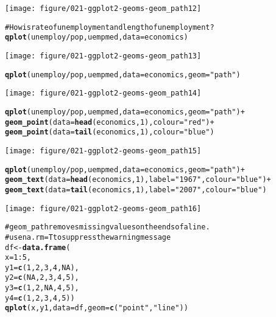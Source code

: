 \documentclass[a4paper,titlepage]{tufte-handout}\usepackage{graphicx, color}
\makeatletter
\def\maxwidth{ %
  \ifdim\Gin@nat@width>\linewidth
    \linewidth
  \else
    \Gin@nat@width
  \fi
}
\newcommand{\hlfunctioncall}[1]{\textcolor[rgb]{0.501960784313725,0,0.329411764705882}{\textbf{#1}}}%
\newcommand{\hlstring}[1]{\textcolor[rgb]{0.6,0.6,1}{#1}}%
\newcommand{\hlcomment}[1]{\textcolor[rgb]{0.180392156862745,0.6,0.341176470588235}{#1}}%
\newenvironment{kframe}{%
 \def\at@end@of@kframe{}%
 \ifinner\ifhmode%
  \def\at@end@of@kframe{\end{minipage}}%
  \begin{minipage}{\columnwidth}%
 \fi\fi%
 \def\FrameCommand##1{\hskip\@totalleftmargin \hskip-\fboxsep
 \colorbox{shadecolor}{##1}\hskip-\fboxsep
     \hskip-\linewidth \hskip-\@totalleftmargin \hskip\columnwidth}%
 \MakeFramed {\advance\hsize-\width
   \@totalleftmargin\z@ \linewidth\hsize
   \@setminipage}}%
 {\par\unskip\endMakeFramed%
 \at@end@of@kframe}
\newenvironment{knitrout}{}{} %
\makeatother
\begin{document}
\begin{knitrout}
\begin{kframe}
\end{kframe}\texttt{[image: figure/021-ggplot2-geoms-geom\_path12]} \begin{kframe}\begin{alltt}
\hlcomment{# How is rate of unemployment and length of unemployment?}
\hlfunctioncall{qplot}(unemploy/pop, uempmed, data=economics)
\end{alltt}
\end{kframe}\texttt{[image: figure/021-ggplot2-geoms-geom\_path13]} \begin{kframe}\begin{alltt}
\hlfunctioncall{qplot}(unemploy/pop, uempmed, data=economics, geom=\hlstring{"path"})
\end{alltt}
\end{kframe}\texttt{[image: figure/021-ggplot2-geoms-geom\_path14]} \begin{kframe}\begin{alltt}
\hlfunctioncall{qplot}(unemploy/pop, uempmed, data=economics, geom=\hlstring{"path"}) +
  \hlfunctioncall{geom_point}(data=\hlfunctioncall{head}(economics, 1), colour=\hlstring{"red"}) +
  \hlfunctioncall{geom_point}(data=\hlfunctioncall{tail}(economics, 1), colour=\hlstring{"blue"})
\end{alltt}
\end{kframe}\texttt{[image: figure/021-ggplot2-geoms-geom\_path15]} \begin{kframe}\begin{alltt}
\hlfunctioncall{qplot}(unemploy/pop, uempmed, data=economics, geom=\hlstring{"path"}) +
  \hlfunctioncall{geom_text}(data=\hlfunctioncall{head}(economics, 1), label=\hlstring{"1967"}, colour=\hlstring{"blue"}) +
  \hlfunctioncall{geom_text}(data=\hlfunctioncall{tail}(economics, 1), label=\hlstring{"2007"}, colour=\hlstring{"blue"})
\end{alltt}
\end{kframe}\texttt{[image: figure/021-ggplot2-geoms-geom\_path16]} \begin{kframe}\begin{alltt}
\hlcomment{# geom_path removes missing values on the ends of a line.}
\hlcomment{# use na.rm = T to suppress the warning message}
df <- \hlfunctioncall{data.frame}(
  x = 1:5,
  y1 = \hlfunctioncall{c}(1, 2, 3, 4, NA),
  y2 = \hlfunctioncall{c}(NA, 2, 3, 4, 5),
  y3 = \hlfunctioncall{c}(1, 2, NA, 4, 5),
  y4 = \hlfunctioncall{c}(1, 2, 3, 4, 5))
\hlfunctioncall{qplot}(x, y1, data = df, geom = \hlfunctioncall{c}(\hlstring{"point"},\hlstring{"line"}))
\end{alltt}



\end{kframe}
\end{knitrout}
\end{document}

